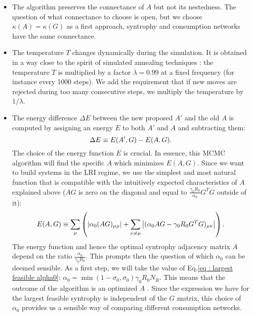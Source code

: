 \documentclass[12pt, titlepage]{report}
\begin{document}
\begin{itemize}
\item The algorithm preserves the connectance of $A$ but not its nestedness. The question of what connectance to choose is open, but we choose $\kappa(A)=\kappa(G)$ as a first approach, \ie syntrophy and consumption networks have the same connectance.
\item The temperature $T$ changes dynamically during the simulation. It is obtained in a way close to the spirit of simulated annealing techniques \cite{gendreau_simulated_2019}: the temperature $T$ is multiplied by a factor $\lambda=0.99$ at a fixed frequency (for instance every 1000 steps). We add the requirement that if new moves are rejected during too many consecutive steps, we multiply the temperature by $1/\lambda$.
\item The energy difference $\Delta E$ between the new proposed $A'$ and the old $A$ is computed by assigning an energy $E$ to both $A'$ and $A$ and subtracting them:
\begin{equation}
\Delta E \equiv E(A', G)-E(A, G).
\end{equation}
The choice of the energy function $E$ is crucial. In essence, this MCMC algorithm will find the specific $A$ which minimizes $E(A, G)$. Since we want to build systems in the LRI regime, we use the simplest and most natural function that is compatible with the intuitively expected characteristics of $A$ explained above (\ie $AG$ is zero on the diagonal and equal to $\frac{\gamma_0 R_0}{\alpha_0} G^TG$ outside of it):
\begin{equation}
E(A,G) \equiv \sum_\mu \left( \left|{\alpha_0(AG)_{\mu\mu}}\right| + \sum_{\nu\neq\mu} \left|{(\alpha_0 AG-\gamma_0 R_0 G^TG)_{\mu\nu} }\right|\right). \label{eq: dynamical stability methods LRI MC solver energy definition}
\end{equation}
The energy function and hence the optimal syntrophy adjacency matrix $A$ depend on the ratio $\frac{\alpha_0}{\gamma_0 R_0}$. This prompts then the question of which $\alpha_0$ can be deemed sensible. As a first step, we will take the value of Eq.\eqref{eq : largest feasible alpha0}: $\alpha_0 = \min(1-\sigma_0, \sigma_0) \gamma_0 R_0 N_R$. This means that the outcome of the algorithm is an optimized $A$ . Since the expression we have for the largest feasible syntrophy is independent of the $G$ matrix, this choice of $\alpha_0$ provides us a sensible way of comparing different consumption networks.
\end{itemize}
\end{document}

